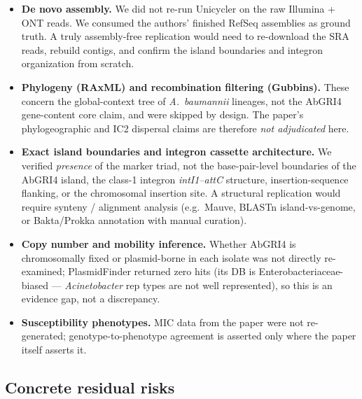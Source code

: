 \documentclass[11pt]{article}
\begin{document}
\begin{itemize}
  \item \textbf{De novo assembly.} We did not re-run Unicycler on the raw Illumina + ONT reads. We consumed
        the authors' finished RefSeq assemblies as ground truth. A truly assembly-free replication would
        need to re-download the SRA reads, rebuild contigs, and confirm the island boundaries and integron
        organization from scratch.
  \item \textbf{Phylogeny (RAxML) and recombination filtering (Gubbins).} These concern the global-context
        tree of \emph{A.\ baumannii} lineages, not the AbGRI4 gene-content core claim, and were skipped
        by design. The paper's phylogeographic and IC2 dispersal claims are therefore \emph{not
        adjudicated} here.
  \item \textbf{Exact island boundaries and integron cassette architecture.} We verified \emph{presence}
        of the marker triad, not the base-pair-level boundaries of the AbGRI4 island, the class-1
        integron \textit{intI1--attC} structure, insertion-sequence flanking, or the chromosomal insertion
        site. A structural replication would require synteny / alignment analysis (e.g.\ Mauve, BLASTn
        island-vs-genome, or Bakta/Prokka annotation with manual curation).
  \item \textbf{Copy number and mobility inference.} Whether AbGRI4 is chromosomally fixed or plasmid-borne
        in each isolate was not directly re-examined; PlasmidFinder returned zero hits (its DB is
        Enterobacteriaceae-biased --- \emph{Acinetobacter} rep types are not well represented), so this
        is an evidence gap, not a discrepancy.
  \item \textbf{Susceptibility phenotypes.} MIC data from the paper were not re-generated; genotype-to-phenotype
        agreement is asserted only where the paper itself asserts it.
\end{itemize}

\subsection{Concrete residual risks}
\end{document}
